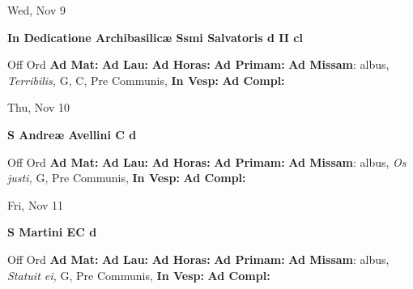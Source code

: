 \documentclass[10pt]{book}
\begin{document}
\begin{center}
\begin{minipage}{3.5in}
\vspace{2em}
\begin{center}Wed, Nov 9
\end{center}
\textbf{ \large In Dedicatione Archibasilicæ Ssmi Salvatoris
\textnormal{\normalsize d II cl}}

\begin{justify}Off Ord
\textbf{Ad Mat: }
\textbf{Ad Lau: }
\textbf{Ad Horas: }
\textbf{Ad Primam: }\textbf{Ad Missam}: albus, \textit{Terribilis,} G, C, Pre Communis, 
\textbf{In Vesp: }
\textbf{Ad Compl: }
\end{justify}
\end{minipage}
\end{center}

\begin{center}
\begin{minipage}{3.5in}
\vspace{2em}
\begin{center}Thu, Nov 10
\end{center}
\textbf{ \large S Andreæ Avellini C
\textnormal{\normalsize d}}

\begin{justify}Off Ord
\textbf{Ad Mat: }
\textbf{Ad Lau: }
\textbf{Ad Horas: }
\textbf{Ad Primam: }\textbf{Ad Missam}: albus, \textit{Os justi,} G, Pre Communis, 
\textbf{In Vesp: }
\textbf{Ad Compl: }
\end{justify}
\end{minipage}
\end{center}

\begin{center}
\begin{minipage}{3.5in}
\vspace{2em}
\begin{center}Fri, Nov 11
\end{center}
\textbf{ \large S Martini  EC
\textnormal{\normalsize d}}

\begin{justify}Off Ord
\textbf{Ad Mat: }
\textbf{Ad Lau: }
\textbf{Ad Horas: }
\textbf{Ad Primam: }\textbf{Ad Missam}: albus, \textit{Statuit ei,} G, Pre Communis, 
\textbf{In Vesp: }
\textbf{Ad Compl: }
\end{justify}
\end{minipage}
\end{center}
\end{document}

